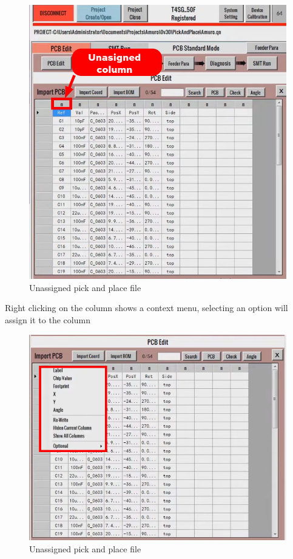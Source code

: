 \documentclass[a4paper,10pt]{report}
\begin{document}
\begin{figure}[!htb]
 \centering
 \includegraphics[width=1\textwidth]{scrot4_1.png}
 \caption{Unassigned pick and place file}
\end{figure}
Right clicking on the column shows a context menu, selecting an option will assign it to the column
\begin{figure}[!htb]
 \centering
 \includegraphics[width=1\textwidth]{scrot4_2.png}
 \caption{Unassigned pick and place file}
\end{figure}
\end{document}

